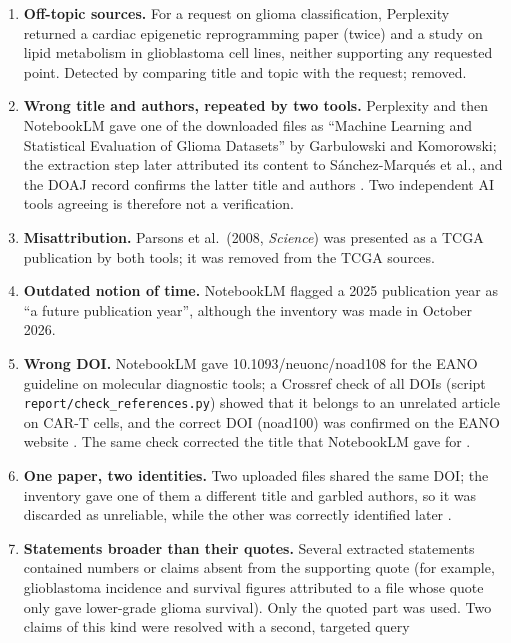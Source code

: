 \begin{enumerate}
  \item \textbf{Off-topic sources.} For a request on glioma classification, Perplexity returned a
        cardiac epigenetic reprogramming paper (twice) and a study on lipid metabolism in glioblastoma
        cell lines, neither supporting any requested point. Detected by comparing title and topic with
        the request; removed.
  \item \textbf{Wrong title and authors, repeated by two tools.} Perplexity and then NotebookLM gave
        one of the downloaded files as ``Machine Learning and Statistical Evaluation of Glioma
        Datasets'' by Garbulowski and Komorowski; the extraction step later attributed its content to
        Sánchez-Marqués et al., and the DOAJ record confirms the latter title and authors
        \cite{sanchezmarques2024}. Two independent AI tools agreeing is therefore not a verification.
  \item \textbf{Misattribution.} Parsons et al.\ (2008, \emph{Science}) was presented as a TCGA
        publication by both tools; it was removed from the TCGA sources.
  \item \textbf{Outdated notion of time.} NotebookLM flagged a 2025 publication year as ``a future
        publication year'', although the inventory was made in October 2026.
  \item \textbf{Wrong DOI.} NotebookLM gave 10.1093/neuonc/noad108 for the EANO guideline on molecular
        diagnostic tools; a Crossref check of all DOIs (script \texttt{report/\allowbreak{}check\_\allowbreak{}references.\allowbreak{}py})
        showed that it belongs to an unrelated article on CAR-T cells, and the correct DOI
        (noad100) was confirmed on the EANO website \cite{sahm2023}. The same check corrected the title
        that NotebookLM gave for \cite{varma2006}.
  \item \textbf{One paper, two identities.} Two uploaded files shared the same DOI; the inventory gave
        one of them a different title and garbled authors, so it was discarded as unreliable, while
        the other was correctly identified later \cite{leiriademendonca2025}.
  \item \textbf{Statements broader than their quotes.} Several extracted statements contained numbers
        or claims absent from the supporting quote (for example, glioblastoma incidence and survival
        figures attributed to a file whose quote only gave lower-grade glioma survival). Only the
        quoted part was used. Two claims of this kind were resolved with a second, targeted query

\end{enumerate}
